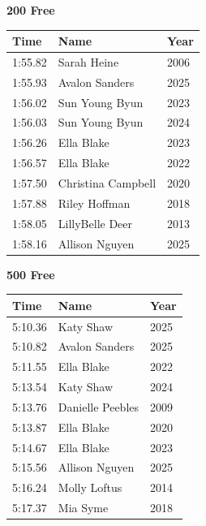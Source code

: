 \vspace{0.3em}
\vspace{1.2em}
\noindent\begin{minipage}[t]{0.48\textwidth}
\centering
\textbf{\textcolor{teamprimary}{200 Free}}\par
\vspace{0.5em}
\centering
\small
\renewcommand{\arraystretch}{1.0}
\setlength{\tabcolsep}{4pt}
\begin{tabular}{@{}p{1.8cm}p{3.0cm}p{1.0cm}@{}}
\toprule
\textbf{Time} & \textbf{Name} & \textbf{Year} \\
\midrule
1:55.82 & Sarah Heine & 2006 \\
1:55.93 & Avalon Sanders & 2025 \\
1:56.02 & Sun Young Byun & 2023 \\
1:56.03 & Sun Young Byun & 2024 \\
1:56.26 & Ella Blake & 2023 \\
1:56.57 & Ella Blake & 2022 \\
1:57.50 & Christina Campbell & 2020 \\
1:57.88 & Riley Hoffman & 2018 \\
1:58.05 & LillyBelle Deer & 2013 \\
1:58.16 & Allison Nguyen & 2025 \\
\bottomrule
\end{tabular}
\end{minipage}
\hfill
\begin{minipage}[t]{0.48\textwidth}
\centering
\textbf{\textcolor{teamprimary}{500 Free}}\par
\vspace{0.5em}
\centering
\small
\renewcommand{\arraystretch}{1.0}
\setlength{\tabcolsep}{4pt}
\begin{tabular}{@{}p{1.8cm}p{3.0cm}p{1.0cm}@{}}
\toprule
\textbf{Time} & \textbf{Name} & \textbf{Year} \\
\midrule
5:10.36 & Katy Shaw & 2025 \\
5:10.82 & Avalon Sanders & 2025 \\
5:11.55 & Ella Blake & 2022 \\
5:13.54 & Katy Shaw & 2024 \\
5:13.76 & Danielle Peebles & 2009 \\
5:13.87 & Ella Blake & 2020 \\
5:14.67 & Ella Blake & 2023 \\
5:15.56 & Allison Nguyen & 2025 \\
5:16.24 & Molly Loftus & 2014 \\
5:17.37 & Mia Syme & 2018 \\
\bottomrule
\end{tabular}
\end{minipage}
